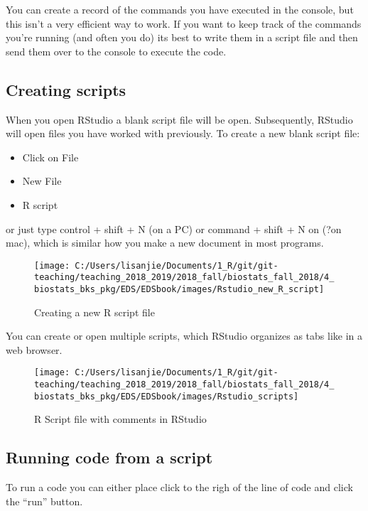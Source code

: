 \documentclass[]{book}
\providecommand{\tightlist}{%
  \setlength{\itemsep}{0pt}\setlength{\parskip}{0pt}}
\theoremstyle{definition}
\theoremstyle{definition}
\theoremstyle{definition}
\theoremstyle{remark}
\begin{document}
You can create a record of the commands you have executed in the
console, but this isn't a very efficient way to work. If you want to
keep track of the commands you're running (and often you do) its best to
write them in a script file and then send them over to the console to
execute the code.

\subsection{Creating scripts}\label{creating-scripts}

When you open RStudio a blank script file will be open. Subsequently,
RStudio will open files you have worked with previously. To create a new
blank script file:

\begin{itemize}
\tightlist
\item
  Click on File
\item
  New File
\item
  R script
\end{itemize}

or just type control + shift + N (on a PC) or command + shift + N on
(?on mac), which is similar how you make a new document in most
programs.

\begin{figure}
\texttt{[image: C:/Users/lisanjie/Documents/1\_R/git/git-teaching/teaching\_2018\_2019/2018\_fall/biostats\_fall\_2018/4\_biostats\_bks\_pkg/EDS/EDSbook/images/Rstudio\_new\_R\_script]} \caption{Creating a new R script file}\label{fig:unnamed-chunk-23}
\end{figure}

You can create or open multiple scripts, which RStudio organizes as tabs
like in a web browser.

\begin{figure}
\texttt{[image: C:/Users/lisanjie/Documents/1\_R/git/git-teaching/teaching\_2018\_2019/2018\_fall/biostats\_fall\_2018/4\_biostats\_bks\_pkg/EDS/EDSbook/images/Rstudio\_scripts]} \caption{R Script file with comments in RStudio}\label{fig:unnamed-chunk-24}
\end{figure}

\subsection{Running code from a
script}\label{running-code-from-a-script}

To run a code you can either place click to the righ of the line of code
and click the ``run'' button.
\end{document}
